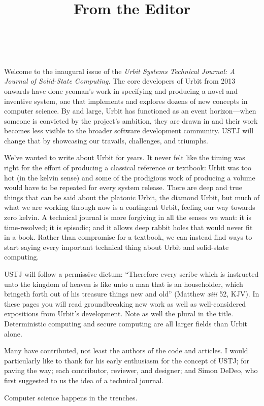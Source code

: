 \documentclass[twoside]{article}
\title{From the Editor}
\author{\authorname~\authorpatp \\ \affiliation}
\date{}
\begin{document}
\thispagestyle{firststyle}

\setcounter{page}{1}

Welcome to the inaugural issue of the \emph{Urbit Systems Technical Journal:  A Journal of Solid-State Computing}.  The core developers of Urbit from 2013 onwards have done yeoman's work in specifying and producing a novel and inventive system, one that implements and explores dozens of new concepts in computer science.  By and large, Urbit has functioned as an event horizon—when someone is convicted by the project's ambition, they are drawn in and their work becomes less visible to the broader software development community.  USTJ will change that by showcasing our travails, challenges, and triumphs.

We've wanted to write about Urbit for years.  It never felt like the timing was right for the effort of producing a classical reference or textbook:  Urbit was too hot (in the kelvin sense) and some of the prodigious work of producing a volume would have to be repeated for every system release.  There are deep and true things that can be said about the platonic Urbit, the diamond Urbit, but much of what we are working through now is a contingent Urbit, feeling our way towards zero kelvin.  A technical journal is more forgiving in all the senses we want:  it is time-resolved; it is episodic; and it allows deep rabbit holes that would never fit in a book.  Rather than compromise for a textbook, we can instead find ways to start saying every important technical thing about Urbit and solid-state computing.

USTJ will follow a permissive dictum:  “Therefore every scribe which is instructed unto the kingdom of heaven is like unto a man that is an householder, which bringeth forth out of his treasure things new and old” (Matthew \emph{xiii} 52, KJV).  In these pages you will read groundbreaking new work as well as well-considered expositions from Urbit's development.  Note as well the plural in the title.  Deterministic computing and secure computing are all larger fields than Urbit alone.

Many have contributed, not least the authors of the code and articles.  I would particularly like to thank  for his early enthusiasm for the concept of USTJ;  for paving the way; each contributor, reviewer, and designer; and Simon DeDeo, who first suggested to us the idea of a technical journal.

Computer science happens in the trenches.  \tombstone{}
\end{document}
